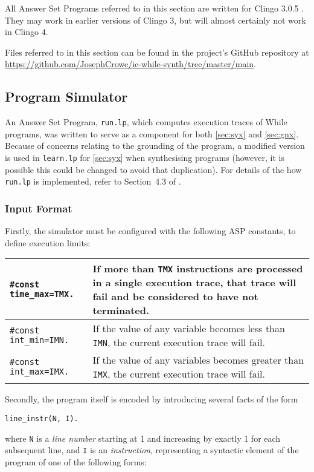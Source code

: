 \documentclass[a4paper,twoside,notitlepage,12pt]{article}
\begin{document}
All Answer Set Programs referred to in this section are written for Clingo 3.0.5 
\cite{clingo3}. They may work in earlier versions of Clingo 3, but will almost
certainly not work in Clingo 4.

Files referred to in this section can be found in the project's GitHub repository at \\
\url{https://github.com/JosephCrowe/ic-while-synth/tree/master/main}.

\subsection{Program Simulator} \label{sec:sim}

An Answer Set Program, \verb|run.lp|, which computes execution traces of While 
programs, was written to serve as a component for both \ref{sec:syx} and 
\ref{sec:gnx}. Because of concerns relating to the grounding of the program, a 
modified version is used in \verb|learn.lp| for \ref{sec:syx} when synthesising 
programs (however, it is possible this could be changed to avoid that duplication). For 
details of the how \verb|run.lp| is implemented, refer to Section~4.3 of \cite{final}.

\subsubsection{Input Format} \label{sec:sim:inp}

Firstly, the simulator must be configured with the following ASP constants, to define 
execution limits:

\begin{tabularx}{\textwidth}{|l|X|}
\hline
\verb|#const time_max=TMX.| &
If more than \verb|TMX| instructions are processed in a single execution trace, that 
trace will fail and be considered to have not terminated. \\*
\hline
\verb|#const int_min=IMN.| &
If the value of any variable becomes less than \verb|IMN|, the current execution trace 
will fail. \\*
\hline
\verb|#const int_max=IMX.| &
If the value of any variables becomes greater than \verb|IMX|, the current execution 
trace will fail. \\*
\hline
\end{tabularx}

Secondly, the program itself is encoded by introducing several facts of the form
\begin{verbatim}
line_instr(N, I).
\end{verbatim}
where \verb|N| is a \emph{line number} starting at 1 and increasing by exactly 1 for
each subsequent line, and \verb|I| is an \emph{instruction}, representing a syntactic
element of the program of one of the following forms:
\end{document}
